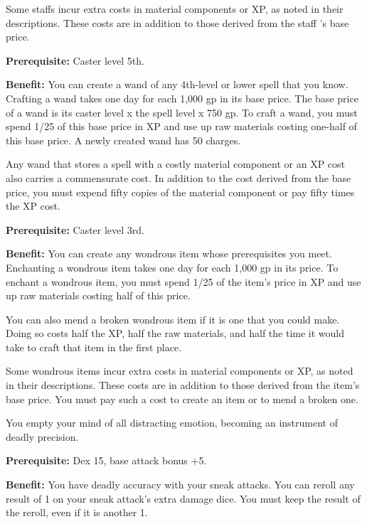 Some staffs incur extra costs in material components or XP, as noted in their descriptions. 
These costs are in addition to those derived from the staff 's base price.


\textbf{Prerequisite:} Caster level 5th.

\textbf{Benefit:} You can create a wand of any 4th-level or lower spell that you 
know. Crafting a wand takes one day for each 1,000 gp in its base price. The base 
price of a wand is its caster level x the spell level x 750 gp. To craft a wand, 
you must spend 1/25 of this base price in XP and use up raw materials costing one-half 
of this base price. A newly created wand has 50 charges.

Any wand that stores a spell with a costly material component or an XP cost also 
carries a commensurate cost. In addition to the cost derived from the base price, 
you must expend fifty copies of the material component or pay fifty times the XP 
cost.


\textbf{Prerequisite:} Caster level 3rd.

\textbf{Benefit:} You can create any wondrous item whose prerequisites you meet. 
Enchanting a wondrous item takes one day for each 1,000 gp in its price. To enchant 
a wondrous item, you must spend 1/25 of the item's price in XP and use up raw materials 
costing half of this price.

You can also mend a broken wondrous item if it is one that you could make. Doing 
so costs half the XP, half the raw materials, and half the time it would take to 
craft that item in the first place.

Some wondrous items incur extra costs in material components or XP, as noted in 
their descriptions. These costs are in addition to those derived from the item's 
base price. You must pay such a cost to create an item or to mend a broken one.


You empty your mind of all distracting emotion, becoming an instrument of deadly 
precision.

\textbf{Prerequisite:} Dex 15, base attack bonus +5.

\textbf{Benefit:} You have deadly accuracy with your sneak attacks. You can reroll 
any result of 1 on your sneak attack's extra damage dice. You must keep the result 
of the reroll, even if it is another 1.

